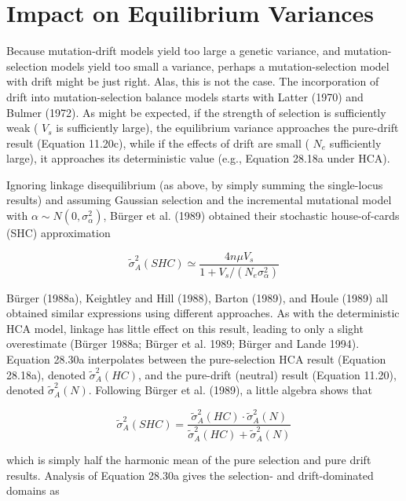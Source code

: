 \documentclass{article}
\begin{document}
\section{Impact on Equilibrium Variances}
Because mutation-drift models yield too large a genetic variance, and mutation-selection models yield too small a variance, perhaps a mutation-selection model with drift might be just right. Alas, this is not the case. The incorporation of drift into mutation-selection balance models starts with Latter (1970) and Bulmer (1972). As might be expected, if the strength of selection is sufficiently weak ( $ V_{s} $ is sufficiently large), the equilibrium variance approaches the pure-drift result (Equation 11.20c), while if the effects of drift are small ( $ N_{e} $ sufficiently large), it approaches its deterministic value (e.g., Equation 28.18a under HCA).

Ignoring linkage disequilibrium (as above, by simply summing the single-locus results) and assuming Gaussian selection and the incremental mutational model with  $ \alpha \sim N(0, \sigma_{\alpha}^{2}) $, Bürger et al. (1989) obtained their stochastic house-of-cards (SHC) approximation

\begin{equation}
\tilde{\sigma}_{A}^{2}(SHC)\simeq\frac{4n\mu V_{s}}{1+V_{s}/(N_{e}\sigma_{\alpha}^{2})}
\tag{28.30a}
\label{eq:28_30a}
\end{equation}

Bürger (1988a), Keightley and Hill (1988), Barton (1989), and Houle (1989) all obtained similar expressions using different approaches. As with the deterministic HCA model, linkage has little effect on this result, leading to only a slight overestimate (Bürger 1988a; Bürger et al. 1989; Bürger and Lande 1994). Equation 28.30a interpolates between the pure-selection HCA result (Equation 28.18a), denoted  $ \widetilde{\sigma}_{A}^{2}(HC) $, and the pure-drift (neutral) result (Equation 11.20), denoted  $ \widetilde{\sigma}_{A}^{2}(N) $. Following Bürger et al. (1989), a little algebra shows that

\begin{equation}
\widetilde{\sigma}_{A}^{2}(S H C)=\frac{\widetilde{\sigma}_{A}^{2}(H C)\cdot\widetilde{\sigma}_{A}^{2}(N)}{\widetilde{\sigma}_{A}^{2}(H C)+\widetilde{\sigma}_{A}^{2}(N)}
\tag{28.30b}
\label{eq:28_30b}
\end{equation}

which is simply half the harmonic mean of the pure selection and pure drift results. Analysis of Equation 28.30a gives the selection- and drift-dominated domains as
\end{document}
